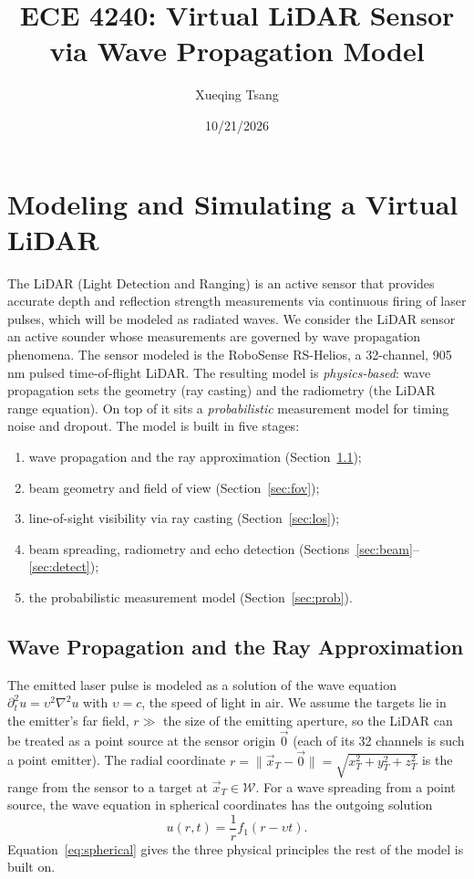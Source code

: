 \documentclass[11pt]{article}
\title{ECE 4240: Virtual LiDAR Sensor via Wave Propagation Model}
\author{Xueqing Tsang}
\date{10/21/2026}
\begin{document}
\maketitle

\section{Modeling and Simulating a Virtual LiDAR}
The LiDAR (Light Detection and Ranging) is an active sensor that provides accurate depth and reflection strength measurements
via continuous firing of laser pulses, which will be modeled as radiated waves. We consider the LiDAR sensor an active sounder whose
measurements are governed by wave propagation phenomena. The sensor modeled is the RoboSense RS-Helios, a 32-channel, 905\,nm pulsed
time-of-flight LiDAR. The resulting model is \emph{physics-based}: wave propagation sets the geometry (ray casting) and the radiometry
(the LiDAR range equation). On top of it sits a \emph{probabilistic} measurement model for timing noise and dropout.
The model is built in five stages:
\begin{enumerate}
    \item wave propagation and the ray approximation (Section~\ref{sec:wave});
    \item beam geometry and field of view (Section~\ref{sec:fov});
    \item line-of-sight visibility via ray casting (Section~\ref{sec:los});
    \item beam spreading, radiometry and echo detection (Sections~\ref{sec:beam}--\ref{sec:detect});
    \item the probabilistic measurement model (Section~\ref{sec:prob}).
\end{enumerate}

\subsection{Wave Propagation and the Ray Approximation}\label{sec:wave}
The emitted laser pulse is modeled as a solution of the wave equation $\partial_t^2 u = \upsilon^2 \nabla^2 u$ with $\upsilon = c$, the speed
of light in air. We assume the targets lie in the emitter's far field, $r \gg$ the size of the emitting aperture, so the LiDAR can be treated
as a point source at the sensor origin $\vec{0}$ (each of its 32 channels is such a point emitter). The radial coordinate
$r = \|\vec{x}_T - \vec{0}\| = \sqrt{x_T^2 + y_T^2 + z_T^2}$ is the range from the sensor to a target at $\vec{x}_T \in \mathcal{W}$. For a wave
spreading from a point source, the wave equation in spherical coordinates has the outgoing solution
\begin{equation}\label{eq:spherical}
    u(r,t) = \frac{1}{r} f_1(r - \upsilon t).
\end{equation}
Equation~\eqref{eq:spherical} gives the three physical principles the rest of the model is built on.
\end{document}
